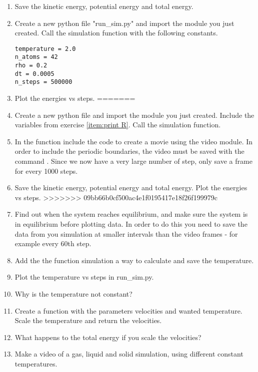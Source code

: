 \documentclass{article}
\begin{document}
\begin{enumerate}[resume]
    \item Save the kinetic energy, potential energy and total energy.
    \item Create a new python file "run\_sim.py" and import the module you just created. Call the simulation function with the following constants.
\begin{lstlisting}
temperature = 2.0
n_atoms = 42
rho = 0.2
dt = 0.0005
n_steps = 500000
\end{lstlisting}

    \item    Plot the energies vs steps.
=======
    \item Create a new python file and import the module you just created. Include the variables from exercise \ref{item:print R}. Call the simulation function.


    \item In the function include the code to create a movie using the video module. In order to include the periodic boundaries, the video must be saved with the command 
    . Since we now have a very large number of step, only save a frame for every 1000 steps.

    \item Save the kinetic energy, potential energy and total energy.
        Plot the energies vs steps.
>>>>>>> 09bb66b0cf500ac4e1f0195417e18f26f199979c

    \item Find out when the system reaches equilibrium, and make sure the system is in equilibrium before plotting data. In order to do this you need to save the data from you simulation at smaller intervals than the video frames - for example every 60th step.

    \item Add the the function simulation a way to calculate and save the
        temperature.
    \item Plot the temperature vs steps in run\_sim.py.

    \item Why is the temperature not constant?

    \item Create a function  with the parameters velocities and wanted temperature.
        Scale the temperature and return the velocities.
        
    \item What happens to the total energy if you scale the velocities?

    \item Make a video of a gas, liquid and solid simulation, using different constant temperatures.

\end{enumerate}
\end{document}
